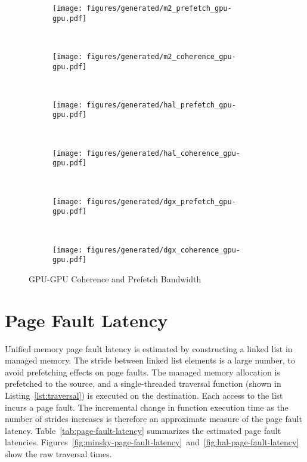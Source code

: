 \begin{figure}[ht]
	\centering
	\begin{subfigure}[b]{0.45\textwidth}
		\texttt{[image: figures/generated/m2\_prefetch\_gpu-gpu.pdf]}
		\caption{}
		\label{fig:um-prefetch-s822lc-gpu-gpu}
	\end{subfigure}
	~
	\begin{subfigure}[b]{0.45\textwidth}
		\texttt{[image: figures/generated/m2\_coherence\_gpu-gpu.pdf]}
		\caption{}
		\label{fig:um-coherence-s822lc-gpu-gpu}
	\end{subfigure}
	\\
	\begin{subfigure}[b]{0.45\textwidth}
		\texttt{[image: figures/generated/hal\_prefetch\_gpu-gpu.pdf]}
		\caption{}
		\label{fig:um-prefetch-ac922-gpu-gpu}
	\end{subfigure}
	~
	\begin{subfigure}[b]{0.45\textwidth}
		\texttt{[image: figures/generated/hal\_coherence\_gpu-gpu.pdf]}
		\caption{}
		\label{fig:um-coherence-ac922-gpu-gpu}
	\end{subfigure}
	\\
	\begin{subfigure}[b]{0.45\textwidth}
		\texttt{[image: figures/generated/dgx\_prefetch\_gpu-gpu.pdf]}
		\caption{}
		\label{fig:um-prefetch-dgx-gpu-gpu}
	\end{subfigure}
	~
	\begin{subfigure}[b]{0.45\textwidth}
		\texttt{[image: figures/generated/dgx\_coherence\_gpu-gpu.pdf]}
		\caption{}
		\label{fig:um-coherence-dgx-gpu-gpu}
	\end{subfigure}
	\caption[]{
		GPU-GPU Coherence and Prefetch Bandwidth
	}
	\label{fig:um-coherence-gpu-gpu}
\end{figure}




\section{Page Fault Latency}

Unified memory page fault latency is estimated by constructing a linked list in managed memory.
The stride between linked list elements is a large number, to avoid prefetching effects on page faults.
The managed memory allocation is prefetched to the source, and a single-threaded traversal function (shown in Listing~\ref{lst:traversal}) is executed on the destination.
Each access to the list incurs a page fault.
The incremental change in function execution time as the number of strides increases is therefore an approximate measure of the page fault latency.
Table~\ref{tab:page-fault-latency} summarizes the estimated page fault latencies.
Figures~\ref{fig:minsky-page-fault-latency}~and~\ref{fig:hal-page-fault-latency} show the raw traversal times.

